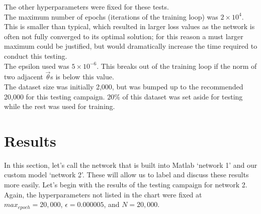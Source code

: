 \documentclass[reqno,14pt]{amsart}
\theoremstyle{plain}
\theoremstyle{definition}
\theoremstyle{remark}
\begin{document}
The other hyperparameters were fixed for these tests. \\
The maximum number of epochs (iterations of the training loop) was $2 \times 10^4$. This is smaller than typical, which resulted in larger loss values as the network is often not fully converged to its optimal solution; for this reason a must larger maximum could be justified, but would dramatically increase the time required to conduct this testing.\\
The epsilon used was $5 \times 10^{-6}$. This breaks out of the training loop if the norm of two adjacent $\overrightarrow{\theta}$s is below this value.\\
The dataset size was initially 2,000, but was bumped up to the recommended 20,000 for this testing campaign. $20\% $ of this dataset was set aside for testing while the rest was used for training.\\

\section{Results}
In this section, let's call the network that is built into Matlab `network 1' and our custom model `network 2'. These will allow us to label and discuss these results more easily. Let's begin with the results of the testing campaign for network 2. Again, the hyperparameters not listed in the chart were fixed at $max_{epoch} = 20,000$, $\epsilon = 0.000005$, and $N = 20,000$.
\end{document}
